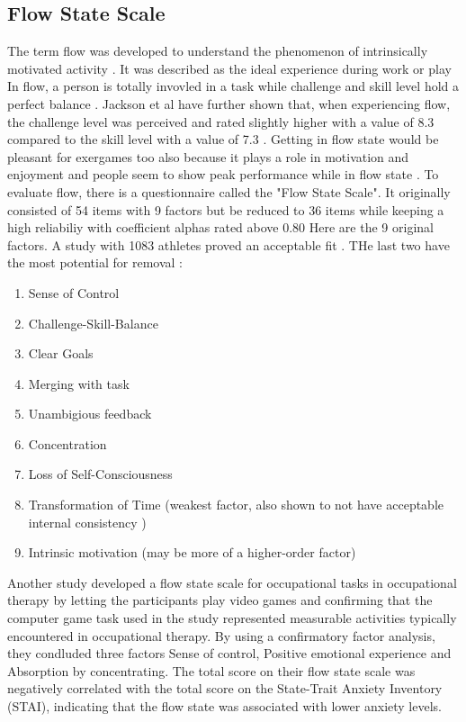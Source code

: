 \subsection{Flow State Scale}
The term flow was developed to understand the phenomenon of intrinsically motivated activity \cite{nakamura02concept}. It was described as the ideal experience during work or play \cite{csikszentmihalyi1992optimal} In flow, a person is totally invovled in a task while challenge and skill level hold a perfect balance \cite{jackson1998psychological}. Jackson et al have further shown that, when experiencing flow, the challenge level was perceived and rated slightly higher with a value of 8.3 compared to the skill level with a value of 7.3 \cite{jackson1996development}. Getting in flow state would be pleasant for exergames too also because it plays a role in motivation and enjoyment and people seem to show peak performance while in flow state \cite{jackson1996development, harris20review}.
To evaluate flow, there is a questionnaire called the "Flow State Scale". It originally consisted of 54 items with 9 factors but be reduced to 36 items while keeping a high reliabiliy with coefficient alphas rated above 0.80 \cite{jackson1996development} 
Here are the 9 original factors. A study with 1083 athletes proved an acceptable fit \cite{stavrou11confirmatory}. THe last two have the most potential for removal \cite{jackson1996development}:
\begin{enumerate}
	\item Sense of Control
	\item Challenge-Skill-Balance
	\item Clear Goals
	\item Merging with task
	\item Unambigious feedback
	\item Concentration
	\item Loss of Self-Consciousness
	\item Transformation of Time (weakest factor, also shown to not have acceptable internal consistency \cite{vlachopoulus00confirmatory})
	\item Intrinsic motivation (may be more of a higher-order factor)
\end{enumerate}

Another study developed a flow state scale for occupational tasks in occupational therapy by letting the participants play video games and confirming that the computer game task used in the study represented measurable activities typically encountered in occupational therapy. By using a confirmatory factor analysis, they condluded three factors Sense of control, Positive emotional experience and Absorption by concentrating.
The total score on their flow state scale was negatively correlated with the total score on the State-Trait Anxiety Inventory (STAI), indicating that the flow state was associated with lower anxiety levels.







